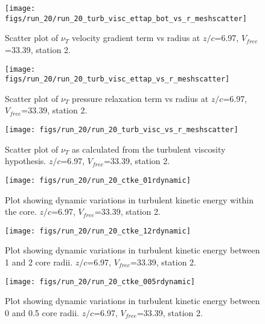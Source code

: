 \begin{figure}[H]
\centering
\texttt{[image: figs/run\_20/run\_20\_turb\_visc\_ettap\_bot\_vs\_r\_meshscatter]}
\caption{Scatter plot of $\nu_T$ velocity gradient term vs radius at $z/c$=6.97, $V_{free}$=33.39, station 2.}
\end{figure}


\begin{figure}[H]
\centering
\texttt{[image: figs/run\_20/run\_20\_turb\_visc\_ettap\_vs\_r\_meshscatter]}
\caption{Scatter plot of $\nu_T$ pressure relaxation term vs radius at $z/c$=6.97, $V_{free}$=33.39, station 2.}
\end{figure}


\begin{figure}[H]
\centering
\texttt{[image: figs/run\_20/run\_20\_turb\_visc\_vs\_r\_meshscatter]}
\caption{Scatter plot of $\nu_T$ as calculated from the turbulent viscosity hypothesis. $z/c$=6.97, $V_{free}$=33.39, station 2.}
\end{figure}


\begin{figure}[H]
\centering
\texttt{[image: figs/run\_20/run\_20\_ctke\_01rdynamic]}
\caption{Plot showing dynamic variations in turbulent kinetic energy within the core. $z/c$=6.97, $V_{free}$=33.39, station 2.}
\end{figure}


\begin{figure}[H]
\centering
\texttt{[image: figs/run\_20/run\_20\_ctke\_12rdynamic]}
\caption{Plot showing dynamic variations in turbulent kinetic energy between 1 and 2 core radii. $z/c$=6.97, $V_{free}$=33.39, station 2.}
\end{figure}


\begin{figure}[H]
\centering
\texttt{[image: figs/run\_20/run\_20\_ctke\_005rdynamic]}
\caption{Plot showing dynamic variations in turbulent kinetic energy between 0 and 0.5 core radii. $z/c$=6.97, $V_{free}$=33.39, station 2.}
\end{figure}


